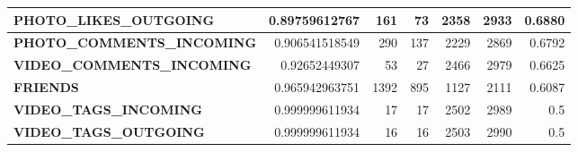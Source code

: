 \documentclass[letterpaper]{article}
\begin{document}
\begin{figure}
\begin{table}
\begin{tabular}{| >{\small}l | >{\small}r | >{\small}r | >{\small}r | >{\small}r | >{\small}r | >{\small}r |}
	\hline
	\textbf{PHOTO\_LIKES\_OUTGOING} & 0.89759612767 & 161 & 73 & 2358 & 2933 & 0.6880\\
	\hline
	\textbf{PHOTO\_COMMENTS\_INCOMING} & 0.906541518549 & 290 & 137 & 2229 & 2869 & 0.6792\\
	\hline
	\textbf{VIDEO\_COMMENTS\_INCOMING} & 0.92652449307 & 53 & 27 & 2466 & 2979 & 0.6625\\
	\hline
	\textbf{FRIENDS} & 0.965942963751 & 1392 & 895 & 1127 & 2111 & 0.6087\\
	\hline
	\textbf{VIDEO\_TAGS\_INCOMING} & 0.999999611934 & 17 & 17 & 2502 & 2989 & 0.5\\
	\hline
	\textbf{VIDEO\_TAGS\_OUTGOING} & 0.999999611934 & 16 & 16 & 2503 & 2990 & 0.5\\
	\hline
	\end{tabular}
\end{table}

\cleardoublepage


\end{figure}
\end{document}
